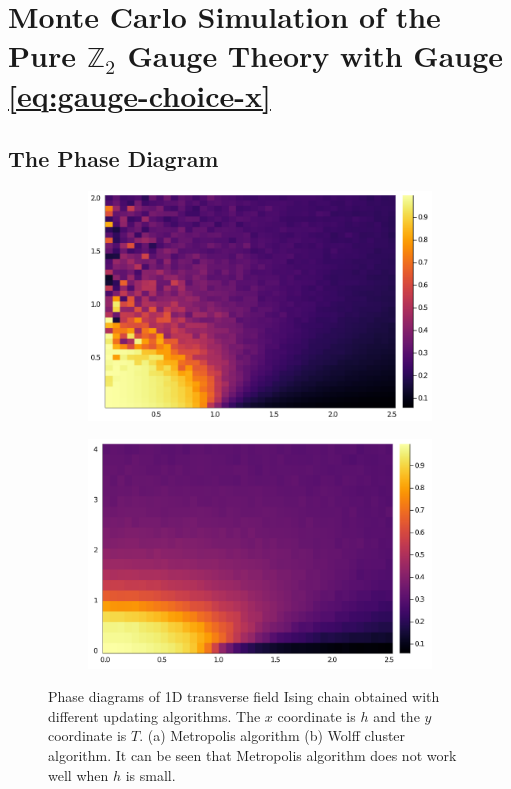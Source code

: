 \documentclass[hyperref, a4paper]{article}
\newcommand*{\Ztwo}{$\mathbb{Z}_2$ }
\begin{document}
\section{Monte Carlo Simulation of the Pure \Ztwo Gauge Theory with Gauge \eqref{eq:gauge-choice-x}}

\subsection{The Phase Diagram}

\begin{figure}
    \centering
    \begin{subfigure}{0.45\textwidth}
        \centering
        \includegraphics[width=\textwidth]{phase/phase-diagram-transverse-ising-metropolis.PNG}
        \subcaption{}
    \end{subfigure}
    \begin{subfigure}{0.45\textwidth}
        \centering
        \includegraphics[width=\textwidth]{phase/phase-diagram-transverse-ising-wolff.PNG}
        \subcaption{}
    \end{subfigure}
    \caption{Phase diagrams of 1D transverse field Ising chain obtained with different updating algorithms. The $x$ coordinate is $h$ and the $y$ coordinate is $T$. (a) Metropolis algorithm (b) Wolff cluster algorithm. 
    It can be seen that Metropolis algorithm does not work well when $h$ is small.}
    \label{fig:comparision-metropolis-wolff}
\end{figure}
\end{document}
